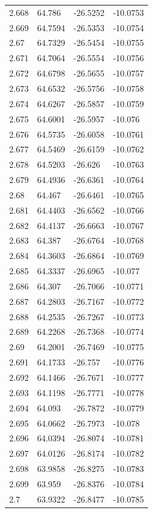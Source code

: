 \begin{tabular}{llll}
2.668 & 64.786 & -26.5252 & -10.0753 \\
2.669 & 64.7594 & -26.5353 & -10.0754 \\
2.67 & 64.7329 & -26.5454 & -10.0755 \\
2.671 & 64.7064 & -26.5554 & -10.0756 \\
2.672 & 64.6798 & -26.5655 & -10.0757 \\
2.673 & 64.6532 & -26.5756 & -10.0758 \\
2.674 & 64.6267 & -26.5857 & -10.0759 \\
2.675 & 64.6001 & -26.5957 & -10.076 \\
2.676 & 64.5735 & -26.6058 & -10.0761 \\
2.677 & 64.5469 & -26.6159 & -10.0762 \\
2.678 & 64.5203 & -26.626 & -10.0763 \\
2.679 & 64.4936 & -26.6361 & -10.0764 \\
2.68 & 64.467 & -26.6461 & -10.0765 \\
2.681 & 64.4403 & -26.6562 & -10.0766 \\
2.682 & 64.4137 & -26.6663 & -10.0767 \\
2.683 & 64.387 & -26.6764 & -10.0768 \\
2.684 & 64.3603 & -26.6864 & -10.0769 \\
2.685 & 64.3337 & -26.6965 & -10.077 \\
2.686 & 64.307 & -26.7066 & -10.0771 \\
2.687 & 64.2803 & -26.7167 & -10.0772 \\
2.688 & 64.2535 & -26.7267 & -10.0773 \\
2.689 & 64.2268 & -26.7368 & -10.0774 \\
2.69 & 64.2001 & -26.7469 & -10.0775 \\
2.691 & 64.1733 & -26.757 & -10.0776 \\
2.692 & 64.1466 & -26.7671 & -10.0777 \\
2.693 & 64.1198 & -26.7771 & -10.0778 \\
2.694 & 64.093 & -26.7872 & -10.0779 \\
2.695 & 64.0662 & -26.7973 & -10.078 \\
2.696 & 64.0394 & -26.8074 & -10.0781 \\
2.697 & 64.0126 & -26.8174 & -10.0782 \\
2.698 & 63.9858 & -26.8275 & -10.0783 \\
2.699 & 63.959 & -26.8376 & -10.0784 \\
2.7 & 63.9322 & -26.8477 & -10.0785 \\

\end{tabular}
